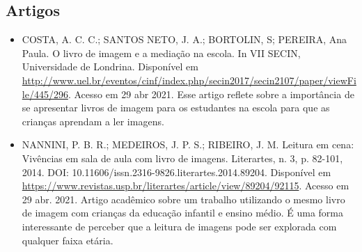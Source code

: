 \documentclass[11pt]{extarticle}
\begin{document}
\subsection{Artigos}

\begin{itemize}
\item COSTA, A. C. C.; SANTOS NETO, J. A.; BORTOLIN, S; PEREIRA, Ana Paula. O livro de imagem e a mediação na escola. 
In VII SECIN, Universidade de Londrina. Disponível em \url{http://www.uel.br/eventos/cinf/index.php/secin2017/secin2107/paper/viewFile/445/296}. 
Acesso em 29 abr 2021. 
Esse artigo reflete sobre a importância de se apresentar livros de imagem para os estudantes na escola para que as crianças aprendam a ler imagens. 

\item NANNINI, P. B. R.; MEDEIROS, J. P. S.; RIBEIRO, J. M. Leitura em cena: Vivências em sala de aula com livro de imagens. 
Literartes, n. 3, p. 82-101, 2014. DOI: 10.11606/issn.2316-9826.literartes.2014.89204. 
Disponível em \url{https://www.revistas.usp.br/literartes/article/view/89204/92115}. Acesso em 29 abr. 2021. 
Artigo acadêmico sobre um trabalho utilizando o mesmo livro de imagem com crianças da educação infantil e ensino médio. 
É uma forma interessante de perceber que a leitura de imagens pode ser explorada com qualquer faixa etária. 
\end{itemize}

% 
\end{document}

